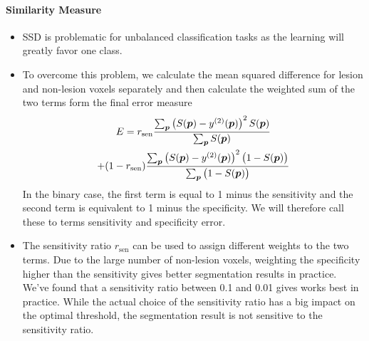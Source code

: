 \paragraph{Similarity Measure}
\begin{itemize}
\item SSD is problematic for unbalanced classification tasks as the learning will
greatly favor one class.
\item To overcome this problem, we calculate the mean squared difference for
lesion and non-lesion voxels separately and then calculate the weighted sum of
the two terms form the final error measure
\begin{multline} 
E = r_\text{sen}\frac{\textstyle\sum_{\vect{p}} \left(S(\vect{p}) -
y^{(2)}(\vect{p})\right)^2 S(\vect{p})}{\textstyle\sum_{\vect{p}} S(\vect{p})}
 \\  +
(1-r_\text{sen})\frac{\textstyle\sum_{\vect{p}} \left(S(\vect{p}) -
y^{(2)}(\vect{p})\right)^2 \big(1 - S(\vect{p})\big)}{%
\textstyle\sum_{\vect{p}}\big(1 - S(\vect{p})\big)}
\end{multline}
In the binary case, the first term is equal to 1 minus the sensitivity and
the second term is equivalent to 1 minus the specificity. We will therefore call
these to terms sensitivity and specificity error.

\item The sensitivity ratio $r_\text{sen}$ can be used to assign different
weights to the two terms. Due to the large number of non-lesion voxels,
weighting the specificity higher than the sensitivity gives better segmentation
results in practice. We've found that a sensitivity ratio between 0.1 and 0.01
gives works best in practice. While the actual choice of the sensitivity ratio
has a big impact on the optimal threshold, the segmentation result is not
sensitive to the sensitivity ratio.



\end{itemize}
